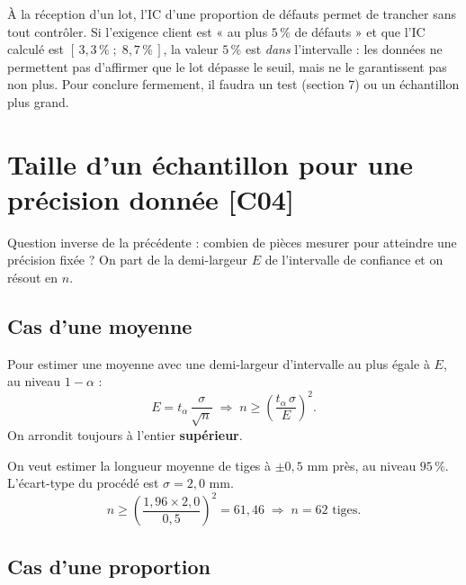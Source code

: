 \documentclass[a4paper,11pt]{article}
\begin{document}
\begin{appliindus}
À la réception d'un lot, l'IC d'une proportion de défauts permet de trancher sans tout contrôler. Si l'exigence client est « au plus $5\,\%$ de défauts » et que l'IC calculé est $[\,3{,}3\,\%\;;\;8{,}7\,\%\,]$, la valeur $5\,\%$ est \emph{dans} l'intervalle : les données ne permettent pas d'affirmer que le lot dépasse le seuil, mais ne le garantissent pas non plus. Pour conclure fermement, il faudra un test (section 7) ou un échantillon plus grand.
\end{appliindus}

\newpage
\section{Taille d'un échantillon pour une précision donnée \hfill {\normalsize\color{uimmred}[C04]}}

Question inverse de la précédente : combien de pièces mesurer pour atteindre une précision fixée ? On part de la demi-largeur $E$ de l'intervalle de confiance et on résout en $n$.

\subsection{Cas d'une moyenne}

\begin{theoreme}
Pour estimer une moyenne avec une demi-largeur d'intervalle au plus égale à $E$, au niveau $1-\alpha$ :
\[
E = t_\alpha\,\frac{\sigma}{\sqrt{n}} \;\Longrightarrow\; \boxed{n \geq \left(\frac{t_\alpha\,\sigma}{E}\right)^2.}
\]
On arrondit toujours à l'entier \textbf{supérieur}.
\end{theoreme}

\begin{exemple}
On veut estimer la longueur moyenne de tiges à $\pm 0{,}5$ mm près, au niveau $95\,\%$. L'écart-type du procédé est $\sigma = 2{,}0$ mm.
\[
n \geq \left(\frac{1{,}96 \times 2{,}0}{0{,}5}\right)^2 = 61{,}46 \;\Longrightarrow\; n = 62 \text{ tiges.}
\]
\end{exemple}

\subsection{Cas d'une proportion}
\end{document}
